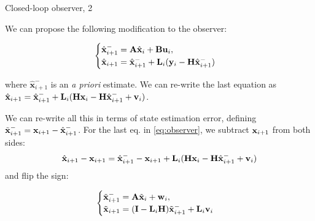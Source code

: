 \documentclass{beamer}
\newcommand{\bhat}[1] {\hat{\mathbf{#1}}}
\newcommand{\btil}[1] {\Tilde{\mathbf{#1}}}
\begin{document}
\begin{frame}{Closed-loop observer, 2}
	\begin{flushleft}
		
		
		We can propose the following modification to the observer:
		
		\begin{equation}
			\label{eq:observer}
			\begin{cases}
				\bhat{x}_{i+1}^- = \bo{A} \bhat{x}_i + \bo{B} \bo{u}_i, \\
				\bhat{x}_{i+1} = \bhat{x}_{i+1}^- + \bo{L}_i (\bo{y}_i - \bo{H} \bhat{x}_{i+1}^-)
			\end{cases}
		\end{equation}
		
		where $\bhat{x}_{i+1}^-$ is an \emph{a priori} estimate. \textcolor{mylightgray}{We can re-write the last equation as 
			$\bhat{x}_{i+1} = \bhat{x}_{i+1}^- + \bo{L}_i (\bo{H} \bo{x}_i - \bo{H} \bhat{x}_{i+1}^- + \bo{v}_i) $.} 
		
		\bigskip
		
		We can re-write all this in terms of state estimation error, defining $\btil{x}_{i+1}^- = \bo{x}_{i+1} - \bhat{x}_{i+1}^-$. For the last eq. in \eqref{eq:observer}, we subtract $\mathbf{x}_{i+1}$ from both sides:
		\begin{equation}
		\bhat{x}_{i+1}-\bo{x}_{i+1} = \bhat{x}_{i+1}^- - \bo{x}_{i+1} + 
		\bo{L}_i (\bo{H} \bo{x}_i - \bo{H} \bhat{x}_{i+1}^- + \bo{v}_i) 
		\end{equation}				
		 and flip the sign:
		
		\begin{equation}
	\begin{cases}
		\btil{x}_{i+1}^- = \bo{A} \btil{x}_i + \bo{w}_i, \\
		\btil{x}_{i+1} = (\bo{I} - \bo{L}_i \bo{H}) \btil{x}_{i+1}^- + \bo{L}_i\bo{v}_i
	\end{cases}
		\end{equation}		
	
		
		
	\end{flushleft}
\end{frame}
\end{document}
